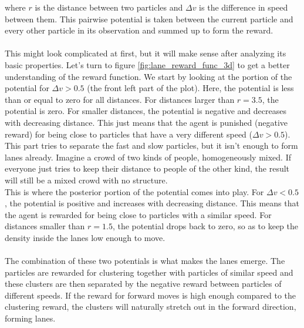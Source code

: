 where $r$ is the distance between two particles and $\Delta v$ is the difference in speed between them. This pairwise potential is taken between the current particle and every other particle in its observation and summed up to form the reward. 
\\
\\
This might look complicated at first, but it will make sense after analyzing its basic properties. Let's turn to figure \ref{fig:lane_reward_func_3d} to get a better understanding of the reward function. We start by looking at the portion of the potential for $\Delta v > 0.5$ (the front left part of the plot). Here, the potential is less than or equal to zero for all distances. For distances larger than $r=3.5$, the potential is zero. For smaller distances, the potential is negative and decreases with decreasing distance. This just means that the agent is punished (negative reward) for being close to particles that have a very different speed ($\Delta v > 0.5$). This part tries to separate the fast and slow particles, but it isn't enough to form lanes already. Imagine a crowd of two kinds of people, homogeneously mixed. If everyone just tries to keep their distance to people of the other kind, the result will still be a mixed crowd with no structure.
\\
This is where the posterior portion of the potential comes into play. For $\Delta v < 0.5$, the potential is positive and increases with decreasing distance. This means that the agent is rewarded for being close to particles with a similar speed. For distances smaller than $r=1.5$, the potential drops back to zero, so as to keep the density inside the lanes low enough to move.
\\
\\
The combination of these two potentials is what makes the lanes emerge. The particles are rewarded for clustering together with particles of similar speed and these clusters are then separated by the negative reward between particles of different speeds. If the reward for forward moves is high enough compared to the clustering reward, the clusters will naturally stretch out in the forward direction, forming lanes.

